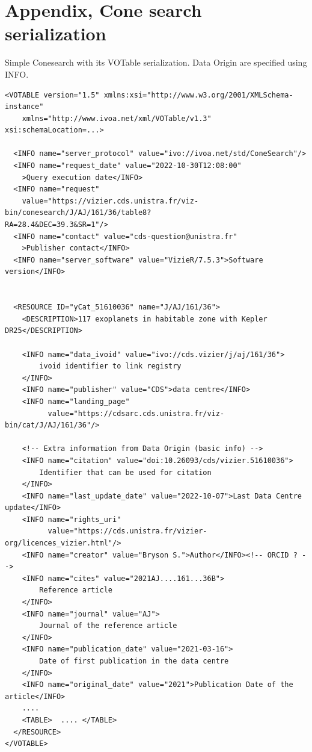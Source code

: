 \documentclass[11pt,a4paper]{ivoa}
\begin{document}
%



\appendix
\section{Appendix, Cone search serialization}\label{sec:appendixA}
Simple Conesearch with its VOTable serialization. Data Origin are specified using  INFO.
\begin{lstlisting}[basicstyle=\footnotesize\ttfamily]
<VOTABLE version="1.5" xmlns:xsi="http://www.w3.org/2001/XMLSchema-instance"
    xmlns="http://www.ivoa.net/xml/VOTable/v1.3" xsi:schemaLocation=...>

  <INFO name="server_protocol" value="ivo://ivoa.net/std/ConeSearch"/>
  <INFO name="request_date" value="2022-10-30T12:08:00"
    >Query execution date</INFO>
  <INFO name="request" 
    value="https://vizier.cds.unistra.fr/viz-bin/conesearch/J/AJ/161/36/table8?
RA=28.4&DEC=39.3&SR=1"/>
  <INFO name="contact" value="cds-question@unistra.fr"
    >Publisher contact</INFO>
  <INFO name="server_software" value="VizieR/7.5.3">Software version</INFO>


  <RESOURCE ID="yCat_51610036" name="J/AJ/161/36">
    <DESCRIPTION>117 exoplanets in habitable zone with Kepler DR25</DESCRIPTION>

    <INFO name="data_ivoid" value="ivo://cds.vizier/j/aj/161/36">
        ivoid identifier to link registry
    </INFO>
    <INFO name="publisher" value="CDS">data centre</INFO>
    <INFO name="landing_page"
          value="https://cdsarc.cds.unistra.fr/viz-bin/cat/J/AJ/161/36"/>

    <!-- Extra information from Data Origin (basic info) -->
    <INFO name="citation" value="doi:10.26093/cds/vizier.51610036">
        Identifier that can be used for citation
    </INFO>
    <INFO name="last_update_date" value="2022-10-07">Last Data Centre update</INFO>
    <INFO name="rights_uri"
          value="https://cds.unistra.fr/vizier-org/licences_vizier.html"/>
    <INFO name="creator" value="Bryson S.">Author</INFO><!-- ORCID ? -->
    <INFO name="cites" value="2021AJ....161...36B">
        Reference article
    </INFO>
    <INFO name="journal" value="AJ">
        Journal of the reference article
    </INFO>
    <INFO name="publication_date" value="2021-03-16">
        Date of first publication in the data centre
    </INFO>
    <INFO name="original_date" value="2021">Publication Date of the article</INFO>
    ....
    <TABLE>  .... </TABLE>
  </RESOURCE>
</VOTABLE>
\end{lstlisting}
\end{document}
